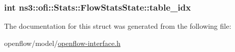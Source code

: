 \subsubsection[{\texorpdfstring{table\+\_\+idx}{table_idx}}]{\setlength{\rightskip}{0pt plus 5cm}int ns3\+::ofi\+::\+Stats\+::\+Flow\+Stats\+State\+::table\+\_\+idx}\hypertarget{structns3_1_1ofi_1_1Stats_1_1FlowStatsState_afee8c219ff60bac538dad0452c6bb75e}{}\label{structns3_1_1ofi_1_1Stats_1_1FlowStatsState_afee8c219ff60bac538dad0452c6bb75e}


The documentation for this struct was generated from the following file\+:\begin{DoxyCompactItemize}
\item 
openflow/model/\hyperlink{openflow-interface_8h}{openflow-\/interface.\+h}\end{DoxyCompactItemize}
